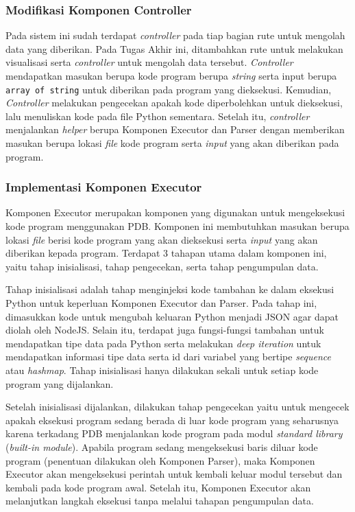 \subsubsection{Modifikasi Komponen Controller}
Pada sistem ini sudah terdapat \textit{controller} pada tiap bagian rute untuk mengolah data yang diberikan. Pada Tugas Akhir ini, ditambahkan rute untuk melakukan visualisasi serta \textit{controller} untuk mengolah data tersebut. \textit{Controller} mendapatkan masukan berupa kode program berupa \textit{string} serta input berupa \verb|array of string| untuk diberikan pada program yang dieksekusi. Kemudian, \textit{Controller} melakukan pengecekan apakah kode diperbolehkan untuk dieksekusi, lalu menuliskan kode pada file Python sementara. Setelah itu, \textit{controller} menjalankan \textit{helper} berupa Komponen Executor dan Parser dengan memberikan masukan berupa lokasi \textit{file} kode program serta \textit{input} yang akan diberikan pada program.

\subsubsection{Implementasi Komponen Executor}
Komponen Executor merupakan komponen yang digunakan untuk mengeksekusi kode program menggunakan PDB. Komponen ini membutuhkan masukan berupa lokasi \textit{file} berisi kode program yang akan dieksekusi serta \textit{input} yang akan diberikan kepada program. Terdapat 3 tahapan utama dalam komponen ini, yaitu tahap inisialisasi, tahap pengecekan, serta tahap pengumpulan data.

Tahap inisialisasi adalah tahap menginjeksi kode tambahan ke dalam eksekusi Python untuk keperluan Komponen Executor dan Parser. Pada tahap ini, dimasukkan kode untuk mengubah keluaran Python menjadi JSON agar dapat diolah oleh NodeJS. Selain itu, terdapat juga fungsi-fungsi tambahan untuk mendapatkan tipe data pada Python serta melakukan \textit{deep iteration} untuk mendapatkan informasi tipe data serta id dari variabel yang bertipe \textit{sequence} atau \textit{hashmap}. Tahap inisialisasi hanya dilakukan sekali untuk setiap kode program yang dijalankan.

Setelah inisialisasi dijalankan, dilakukan tahap pengecekan yaitu untuk mengecek apakah eksekusi program sedang berada di luar kode program yang seharusnya karena terkadang PDB menjalankan kode program pada modul \textit{standard library} (\textit{built-in module}). Apabila program sedang mengeksekusi baris diluar kode program (penentuan dilakukan oleh Komponen Parser), maka Komponen Executor akan mengeksekusi perintah untuk kembali keluar modul tersebut dan kembali pada kode program awal. Setelah itu, Komponen Executor akan melanjutkan langkah eksekusi tanpa melalui tahapan pengumpulan data.

